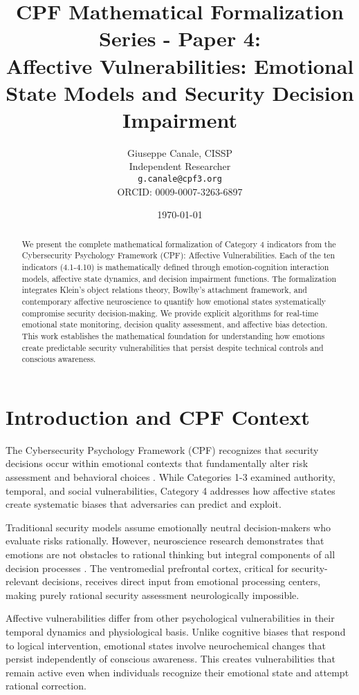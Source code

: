 \documentclass[11pt,a4paper]{article}
\title{CPF Mathematical Formalization Series - Paper 4:\\Affective Vulnerabilities: Emotional State Models and Security Decision Impairment}
\author{
    Giuseppe Canale, CISSP\\
    Independent Researcher\\
    \texttt{g.canale@cpf3.org}\\
    ORCID: 0009-0007-3263-6897
}
\date{\today}
\begin{document}
\maketitle

\begin{abstract}
We present the complete mathematical formalization of Category 4 indicators from the Cybersecurity Psychology Framework (CPF): Affective Vulnerabilities. Each of the ten indicators (4.1-4.10) is mathematically defined through emotion-cognition interaction models, affective state dynamics, and decision impairment functions. The formalization integrates Klein's object relations theory, Bowlby's attachment framework, and contemporary affective neuroscience to quantify how emotional states systematically compromise security decision-making. We provide explicit algorithms for real-time emotional state monitoring, decision quality assessment, and affective bias detection. This work establishes the mathematical foundation for understanding how emotions create predictable security vulnerabilities that persist despite technical controls and conscious awareness.
\end{abstract}

\section{Introduction and CPF Context}

The Cybersecurity Psychology Framework (CPF) recognizes that security decisions occur within emotional contexts that fundamentally alter risk assessment and behavioral choices \cite{canale2024cpf}. While Categories 1-3 examined authority, temporal, and social vulnerabilities, Category 4 addresses how affective states create systematic biases that adversaries can predict and exploit.

Traditional security models assume emotionally neutral decision-makers who evaluate risks rationally. However, neuroscience research demonstrates that emotions are not obstacles to rational thinking but integral components of all decision processes \cite{damasio1994}. The ventromedial prefrontal cortex, critical for security-relevant decisions, receives direct input from emotional processing centers, making purely rational security assessment neurologically impossible.

Affective vulnerabilities differ from other psychological vulnerabilities in their temporal dynamics and physiological basis. Unlike cognitive biases that respond to logical intervention, emotional states involve neurochemical changes that persist independently of conscious awareness. This creates vulnerabilities that remain active even when individuals recognize their emotional state and attempt rational correction.
\end{document}
